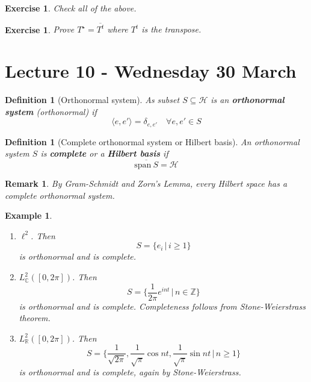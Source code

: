 \documentclass[12pt, oneside, a4paper]{article}
\theoremstyle{dfn}
\newtheorem{dfn}[thm]{Definition}
\newtheorem{rem}[thm]{Remark}
\newtheorem{ex}[thm]{Example}
\newtheorem{exer}[thm]{Exercise}
\newcommand{\R}{\mathbb{R}}
\newcommand{\Hil}{\mathcal{H}}
\newcommand{\Com}{\mathbb{C}}
\newcommand{\Z}{\mathbb{Z}}
\newcommand{\spans}{\text{span}\ }
\begin{document}
\begin{exer}
    Check all of the above.
\end{exer}

\begin{exer}
    Prove $T^\star = \overline{T^t}$ where $T^t$ is the transpose.   
\end{exer}

\section{Lecture 10 - Wednesday 30 March} %
\label{sec:lecture_10_wednesday_30_march}

\begin{dfn}[Orthonormal system]
    As subset $S \subseteq \Hil$ is an \textbf{orthonormal system} (orthonormal) if \[
        \langle e, e' \rangle = \delta_{e, e'} \quad \forall e, e' \in S
    \]
\end{dfn}

\begin{dfn}[Complete orthonormal system or Hilbert basis]
    An orthonormal system $S$ is \textbf{complete} or a \textbf{Hilbert basis} if \[
        \overline{\spans S} = \Hil
    \]
\end{dfn}

\begin{rem}
    By Gram-Schmidt and Zorn's Lemma, every Hilbert space has a complete orthonormal system.   
\end{rem}

\begin{ex}
    \begin{enumerate}
        \item $\ell^2$.  Then \[
            S = \{ e_i \, | \, i \geq 1 \}
        \] is orthonormal and is complete.  
        \item $L^2_\Com([0, 2 \pi])$.  Then \[
            S = \{ \frac{1}{2\pi} e^{i n t} \, | \, n \in \Z \}
        \] is orthonormal and is complete.  Completeness follows from Stone-Weierstrass theorem.
        \item $L^2_\R([0, 2 \pi])$.  Then \[
            S= \{ \frac{1}{\sqrt{2\pi}}, \frac{1}{\sqrt{\pi}} \cos nt, \frac{1}{\sqrt{\pi}} \sin nt \, | \, n \geq 1 \}
        \] is orthonormal and is complete, again by Stone-Weierstrass.  
    \end{enumerate}
\end{ex}
\end{document}
